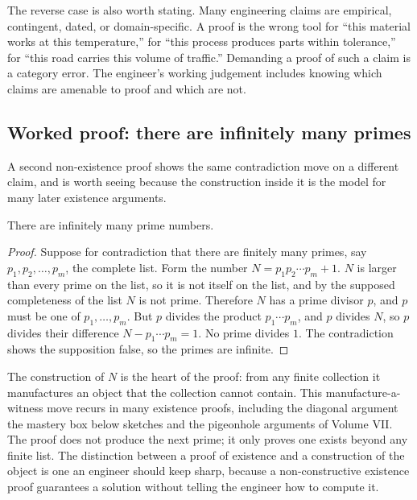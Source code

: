 The reverse case is also worth stating. Many engineering claims are
empirical, contingent, dated, or domain-specific. A proof is the
wrong tool for ``this material works at this temperature,'' for ``this
process produces parts within tolerance,'' for ``this road carries
this volume of traffic.'' Demanding a proof of such a claim is a
category error. The engineer's working judgement includes knowing
which claims are amenable to proof and which are not.

\subsection{Worked proof: there are infinitely many primes}

A second non-existence proof shows the same contradiction move on a
different claim, and is worth seeing because the construction inside it
is the model for many later existence arguments.

\begin{theorem}
There are infinitely many prime numbers.
\end{theorem}

\begin{proof}
Suppose for contradiction that there are finitely many primes, say
$p_{1}, p_{2}, \ldots, p_{m}$, the complete list. Form the number
$N = p_{1} p_{2} \cdots p_{m} + 1$. $N$ is larger than every prime on
the list, so it is not itself on the list, and by the supposed
completeness of the list $N$ is not prime. Therefore $N$ has a prime
divisor $p$, and $p$ must be one of $p_{1}, \ldots, p_{m}$. But $p$
divides the product $p_{1} \cdots p_{m}$, and $p$ divides $N$, so $p$
divides their difference $N - p_{1} \cdots p_{m} = 1$. No prime
divides $1$. The contradiction shows the supposition false, so the
primes are infinite.
\end{proof}

The construction of $N$ is the heart of the proof: from any finite
collection it manufactures an object that the collection cannot
contain. This manufacture-a-witness move recurs in many existence
proofs, including the diagonal argument the mastery box below sketches
and the pigeonhole arguments of Volume VII. The proof does not produce
the next prime; it only proves one exists beyond any finite list. The
distinction between a proof of existence and a construction of the
object is one an engineer should keep sharp, because a non-constructive
existence proof guarantees a solution without telling the engineer how
to compute it.

